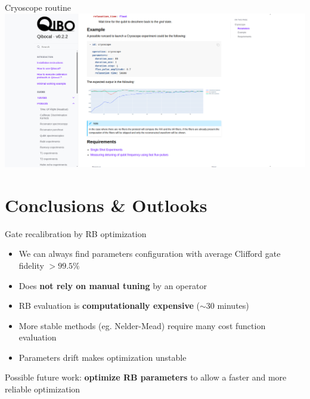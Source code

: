 \documentclass[aspectratio=169,10pt]{beamer}
\begin{document}
\begin{frame}{Cryoscope routine}
  \centering
  \includegraphics[height=\textheight]{figures/cryoscope_routine.png}
\end{frame}


\section{Conclusions \& Outlooks}

\begin{frame}{Gate recalibration by RB optimization}
  \begin{itemize}
    \item[\ding{51}] We can always find parameters configuration with average Clifford gate fidelity $> 99.5\%$
    \item[\ding{51}] Does \textbf{not rely on manual tuning} by an operator
    \item[\ding{55}] RB evaluation is \textbf{computationally expensive} ($\sim 30$ minutes)
    \item[\ding{55}] More stable methods (eg. Nelder-Mead) require many cost function evaluation
    \item[\ding{55}] Parameters drift makes optimization unstable
  \end{itemize}
  Possible future work: \textbf{optimize RB parameters} to allow a faster and more reliable optimization
\end{frame}
\end{document}
